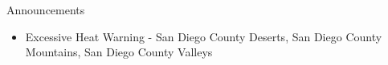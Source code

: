 \begin{frame}{Announcements}
    \begin{itemize}
        \item Excessive Heat Warning - San Diego County Deserts, San Diego County Mountains, San Diego County Valleys
    \end{itemize}
\end{frame}
